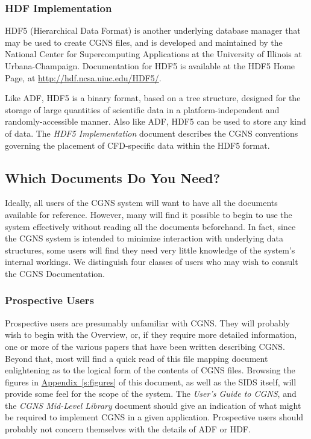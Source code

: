 \subsubsection{HDF Implementation}

HDF5 (Hierarchical Data Format) is another underlying database manager
that may be used to create CGNS files, and is developed and maintained
by the National Center for Supercomputing Applications at the University
of Illinois at Urbana-Champaign.
Documentation for HDF5 is available at the HDF5 Home Page, at
\url{http://hdf.ncsa.uiuc.edu/HDF5/}.

Like ADF, HDF5 is a binary format, based on a tree structure,
designed for the storage of large quantities of scientific data in a
platform-independent and randomly-accessible manner.
Also like ADF, HDF5 can be used to store any kind of data.
The \textit{HDF5 Implementation} document describes the CGNS
conventions governing the placement of CFD-specific data within the HDF5
format.

\subsection{Which Documents Do You Need?}

Ideally, all users of the CGNS system will want to have all the
documents available for reference. However, many will find it possible
to begin to use the system effectively without reading all the documents
beforehand.  In fact, since the CGNS system is intended to minimize
interaction with underlying data structures, some users will find
they need very little knowledge of the system's internal workings. We
distinguish four classes of users who may wish to consult the CGNS
Documentation.

\subsubsection{Prospective Users}

Prospective users are presumably unfamiliar with CGNS. They will
probably wish to begin with the Overview, or, if they require more
detailed information, one or more of the various papers that have been
written describing CGNS.
Beyond that, most will find a quick read of this file mapping document
enlightening as to the logical form of the contents of CGNS files.
Browsing the figures in
\hyperref[s:figures]{Appendix~\ref*{s:figures}}
of this document, as well as the SIDS itself, will provide some feel
for the scope of the system.
The \textit{User's Guide to CGNS}, and the \textit{CGNS Mid-Level
Library} document should give an indication of what might be required to
implement CGNS in a given application.
Prospective users should probably not concern themselves with the
details of ADF or HDF.

